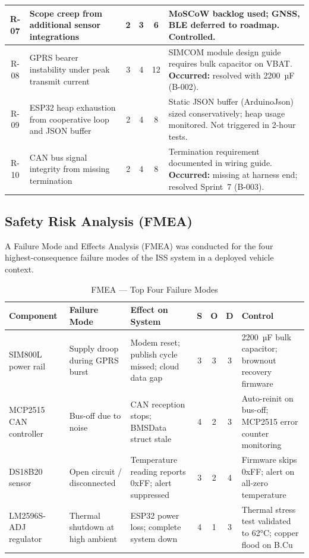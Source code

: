 \begin{table}[H]
\begin{tabular}{c p{3.8cm} c c c p{4.5cm}}
\midrule
R-07 & Scope creep from additional sensor integrations & 2 & 3 & 6 & MoSCoW backlog used; GNSS, BLE deferred to roadmap. Controlled. \\
\midrule
R-08 & GPRS bearer instability under peak transmit current & 3 & 4 & 12 & SIMCOM module design guide requires bulk capacitor on VBAT. \textbf{Occurred:} resolved with 2200~µF (B-002). \\
\midrule
R-09 & ESP32 heap exhaustion from cooperative loop and JSON buffer & 2 & 4 & 8 & Static JSON buffer (ArduinoJson) sized conservatively; heap usage monitored. Not triggered in 2-hour tests. \\
\midrule
R-10 & CAN bus signal integrity from missing termination & 2 & 4 & 8 & Termination requirement documented in wiring guide. \textbf{Occurred:} missing at harness end; resolved Sprint~7 (B-003). \\
\bottomrule
\end{tabular}
\end{table}

\subsection{Safety Risk Analysis (FMEA)}

A Failure Mode and Effects Analysis (FMEA) was conducted for the four highest-consequence failure modes of the ISS system in a deployed vehicle context.

\begin{table}[H]
\centering
\caption{FMEA --- Top Four Failure Modes}
\label{tab:fmea}
\small
\begin{tabular}{p{2.5cm} p{2.5cm} p{2.5cm} c c c p{2.5cm}}
\toprule
Component & Failure Mode & Effect on System & S & O & D & Control \\
\midrule
SIM800L power rail & Supply droop during GPRS burst & Modem reset; publish cycle missed; cloud data gap & 3 & 3 & 3 & 2200~µF bulk capacitor; brownout recovery firmware \\
\midrule
MCP2515 CAN controller & Bus-off due to noise & CAN reception stops; BMSData struct stale & 4 & 2 & 3 & Auto-reinit on bus-off; MCP2515 error counter monitoring \\
\midrule
DS18B20 sensor & Open circuit / disconnected & Temperature reading reports 0xFF; alert suppressed & 3 & 2 & 4 & Firmware skips 0xFF; alert on all-zero temperature \\
\midrule
LM2596S-ADJ regulator & Thermal shutdown at high ambient & ESP32 power loss; complete system down & 4 & 1 & 3 & Thermal stress test validated to 62°C; copper flood on B.Cu \\
\bottomrule
\end{tabular}
\end{table}

